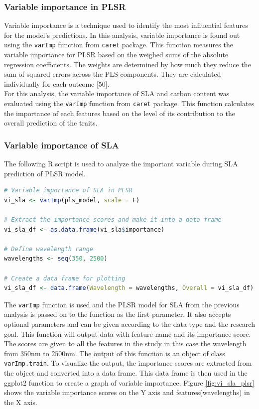 \documentclass[12pt,a4paper]{report}
\begin{document}
\subsubsection{Variable importance in PLSR}
Variable importance is a technique used to identify the most influential features for the model's predictions. In this analysis, variable importance is found out using the \texttt{varImp} function from \texttt{caret} package. This function measures the variable importance for PLSR based on the weighed sums of the absolute regression coefficients. The weights are determined by how much they reduce the sum of squared errors across the PLS components. They are calculated individually for each outcome [50].\\

For this analysis, the variable importance of SLA and carbon content was evaluated using the \texttt{varImp} function from \texttt{caret} package. This function calculates the importance of each features based on the level of its contribution to the overall prediction of the traits. \\ 

\subsubsection*{Variable importance of SLA}
The following R script is used to analyze the important variable during SLA prediction of PLSR model. \\

\begin{lstlisting}[language=R, style=mystyle]
# Variable importance of SLA in PLSR
vi_sla <- varImp(pls_model, scale = F)

# Extract the importance scores and make it into a data frame
vi_sla_df <- as.data.frame(vi_sla$importance)

# Define wavelength range
wavelengths <- seq(350, 2500)

# Create a data frame for plotting
vi_sla_df <- data.frame(Wavelength = wavelengths, Overall = vi_sla_df)
\end{lstlisting}

The \texttt{varImp} function is used and the PLSR model for SLA from the previous analysis is passed on to the function as the first parameter. It also accepts optional parameters and can be given according to the data type and the research goal. This function will output data with feature name and its importance score. The scores are given to all the features in the study in this case the wavelength from $350$nm to $2500$nm. The output of this function is an object of class \texttt{varImp.train}. To visualize the output, the importance scores are extracted from the object and converted into a data frame. This data frame is then used in the ggplot2 function to create a graph of variable importance. Figure \ref{fig:vi_sla_plsr} shows the variable importance scores on the Y axis and features(wavelengths) in the X axis.  \\
\end{document}
